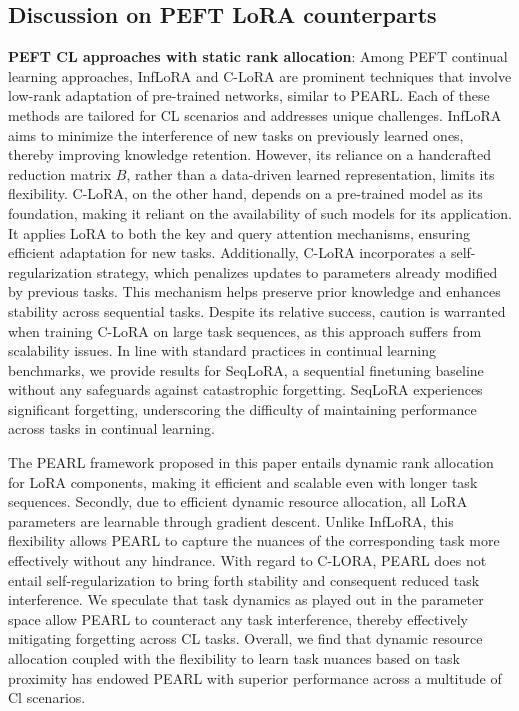 \documentclass[10pt]{article} %
\begin{document}
\subsection{Discussion on PEFT LoRA counterparts} \label{appendix:dynamic_lora_methods}
\textbf{PEFT CL approaches with static rank allocation}: Among PEFT continual learning approaches, InfLoRA \citep{liang2024inflora} and C-LoRA \citep{DBLP:journals/corr/abs-2304-06027} are prominent techniques that involve low-rank adaptation of pre-trained networks, similar to PEARL. Each of these methods are tailored for CL scenarios and addresses unique challenges. InfLoRA aims to minimize the interference of new tasks on previously learned ones, thereby improving knowledge retention. However, its reliance on a handcrafted reduction matrix $B$, rather than a data-driven learned representation, limits its flexibility. C-LoRA, on the other hand, depends on a pre-trained model as its foundation, making it reliant on the availability of such models for its application. It applies LoRA to both the key and query attention mechanisms, ensuring efficient adaptation for new tasks. Additionally, C-LoRA incorporates a self-regularization strategy, which penalizes updates to parameters already modified by previous tasks. This mechanism helps preserve prior knowledge and enhances stability across sequential tasks. Despite its relative success, caution is warranted when training C-LoRA on large task sequences, as this approach suffers from scalability issues. In line with standard practices in continual learning benchmarks, we provide results for SeqLoRA, a sequential finetuning baseline without any safeguards against catastrophic forgetting. SeqLoRA experiences significant forgetting, underscoring the difficulty of maintaining performance across tasks in continual learning.

The PEARL framework proposed in this paper entails dynamic rank allocation for LoRA components, making it efficient and scalable even with longer task sequences. Secondly, due to efficient dynamic resource allocation, all LoRA parameters are learnable through gradient descent. Unlike InfLoRA, this flexibility allows PEARL to capture the nuances of the corresponding task more effectively without any hindrance. With regard to C-LORA, PEARL does not entail self-regularization to bring forth stability and consequent reduced task interference. We speculate that task dynamics as played out in the parameter space allow PEARL to counteract any task interference, thereby effectively mitigating forgetting across CL tasks. Overall, we find that dynamic resource allocation coupled with the flexibility to learn task nuances based on task proximity has endowed PEARL with superior performance across a multitude of Cl scenarios.
\end{document}
